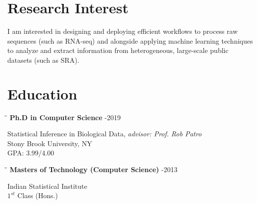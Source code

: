 \documentclass{res}
\begin{document}
\begin{resume}
\section{Research Interest}
I am interested in designing and deploying efficient workflows to process raw sequences (such as RNA-seq) and alongside applying machine learning techniques to analyze and extract information from heterogeneous, large-scale public datasets (such as SRA).

\vspace{-0.2in}
\section{Education}          
  \vspace{-0.1in}	
   \begin{tabbing}
   \hspace{2.3in}\= \hspace{2.6in}\= \kill %
     {\bf Ph.D in Computer Science} \>   -2019
   \end{tabbing}  \vspace{-20pt}      %
       Statistical Inference in Biological Data, {\it advisor: Prof. Rob Patro}  \\        
       Stony Brook University, NY     \\
       GPA: 3.99/4.00
 
 
 \vspace{-0.1in}	
   \begin{tabbing}
   \hspace{2.3in}\= \hspace{2.6in}\= \kill %
     {\bf Masters of Technology (Computer Science)}  \>     -2013 
   \end{tabbing}  \vspace{-20pt}      %
       Indian Statistical Institute     \\
       $1^{st}$ Class (Hons.) 



\end{resume}
\end{document}
